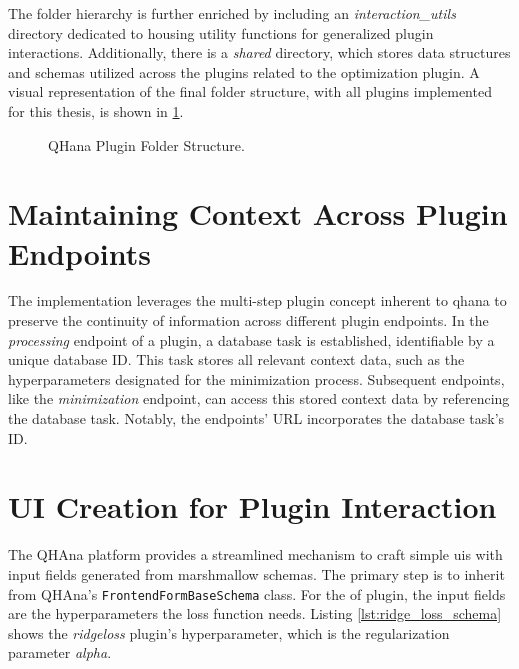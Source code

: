 \documentclass[
  a4paper,  %
  twoside,  %
  bibliography=totoc,
  headsepline,
  cleardoublepage=empty,
  parskip=half,
  draft=false
]{scrbook}
\begin{document}
The folder hierarchy is further enriched by including an \textit{interaction\_utils} directory dedicated to housing utility functions for generalized plugin interactions.
Additionally, there is a \textit{shared} directory, which stores data structures and schemas utilized across the plugins related to the optimization plugin.
A visual representation of the final folder structure, with all plugins implemented for this thesis, is shown in \cref{fig:folderStructure}.


\begin{figure}[h!]
  \caption{QHana Plugin Folder Structure.}
  \label{fig:folderStructure}
\end{figure}

\section{Maintaining Context Across Plugin Endpoints}
\label{sec:contextBetweenPluginEndpoints}

The implementation leverages the multi-step plugin concept inherent to \gls{qhana} to preserve the continuity of information across different plugin endpoints.
In the \emph{processing} endpoint of a plugin, a database task is established, identifiable by a unique database ID.
This task stores all relevant context data, such as the hyperparameters designated for the minimization process.
Subsequent endpoints, like the \emph{minimization} endpoint, can access this stored context data by referencing the database task.
Notably, the endpoints' URL incorporates the database task's ID.


\section{UI Creation for Plugin Interaction}
\label{sec:uiCreationForPluginInteraction}
The QHAna platform provides a streamlined mechanism to craft simple \glspl{ui} with input fields generated from marshmallow schemas.
The primary step is to inherit from QHAna's \texttt{FrontendFormBaseSchema} class.
For the \gls{of} plugin, the input fields are the hyperparameters the loss function needs.
Listing \ref{lst:ridge_loss_schema} shows the \emph{ridge\-loss} plugin's hyperparameter, which is the regularization parameter \emph{alpha}.
\end{document}
